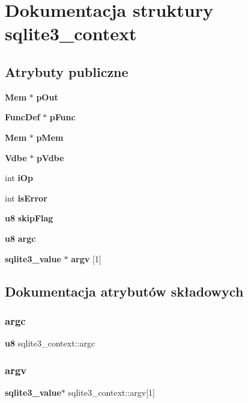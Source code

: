 \section{Dokumentacja struktury sqlite3\+\_\+context}
\label{structsqlite3__context}
\subsection*{Atrybuty publiczne}
\begin{DoxyCompactItemize}
\item 
\textbf{ Mem} $\ast$ \textbf{ p\+Out}
\item 
\textbf{ Func\+Def} $\ast$ \textbf{ p\+Func}
\item 
\textbf{ Mem} $\ast$ \textbf{ p\+Mem}
\item 
\textbf{ Vdbe} $\ast$ \textbf{ p\+Vdbe}
\item 
int \textbf{ i\+Op}
\item 
int \textbf{ is\+Error}
\item 
\textbf{ u8} \textbf{ skip\+Flag}
\item 
\textbf{ u8} \textbf{ argc}
\item 
\textbf{ sqlite3\+\_\+value} $\ast$ \textbf{ argv} [1]
\end{DoxyCompactItemize}


\subsection{Dokumentacja atrybutów składowych}
\mbox{\label{structsqlite3__context_a3246bd9287c845864193f0519804aede}} 
\subsubsection{argc}
{\footnotesize\ttfamily \textbf{ u8} sqlite3\+\_\+context\+::argc}

\mbox{\label{structsqlite3__context_a416e22362626c80a9dd4c7909871d90c}} 
\subsubsection{argv}
{\footnotesize\ttfamily \textbf{ sqlite3\+\_\+value}$\ast$ sqlite3\+\_\+context\+::argv[1]}

\mbox{\label{structsqlite3__context_a6f5930106488b9ead6f8efefe9125b6c}} 
